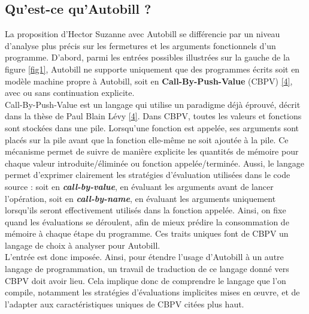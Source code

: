\documentclass[12pt]{article}
\begin{document}
\hypertarget{quest-ce-quautobill}{%
  \subsection{Qu'est-ce qu'Autobill ?}\label{quest-ce-quautobill}}

La proposition d'Hector Suzanne avec Autobill se différencie par un
niveau d'analyse plus précis sur les fermetures et les arguments
fonctionnels d'un programme. D'abord, parmi les entrées possibles
illustrées sur la gauche de la figure \ref{fig1}, Autobill ne supporte
uniquement que des programmes écrits soit en modèle machine propre à
Autobill, soit en \textbf{Call-By-Push-Value} (CBPV)
\protect\hyperlink{ref-Levy}{{[}4{]}}, avec ou sans continuation
explicite. \\ 

Call-By-Push-Value est un langage qui utilise un paradigme déjà éprouvé,
décrit dans la thèse de Paul Blain Lévy
\protect\hyperlink{ref-Levy}{{[}4{]}}. Dans CBPV, toutes les valeurs et fonctions sont stockées dans une pile. Lorsqu'une fonction est appelée, ses arguments sont placés sur la pile avant que la fonction elle-même ne soit ajoutée à la pile. Ce mécanisme permet de suivre de manière explicite les quantités de mémoire pour chaque valeur introduite/éliminée ou fonction appelée/terminée. Aussi,
le langage permet d'exprimer clairement les stratégies d'évaluation utilisées dans le code source : soit en \textbf{\textit{call-by-value}}, en évaluant les arguments avant de lancer l'opération, soit en \textbf{\textit{call-by-name}}, en évaluant les arguments uniquement lorsqu’ils seront effectivement utilisés dans la fonction appelée. Ainsi, on fixe quand les évaluations se déroulent, afin de mieux prédire la consommation de mémoire à chaque
étape du programme. Ces traits uniques font de CBPV un langage de choix à analyser pour Autobill. \\

L'entrée est donc imposée. Ainsi, pour étendre l'usage d'Autobill à un
autre langage de programmation, un travail de traduction de ce langage
donné vers CBPV doit avoir lieu. Cela implique donc de comprendre le
langage que l'on compile, notamment les stratégies d'évaluations
implicites mises en œuvre, et de l'adapter aux caractéristiques uniques
de CBPV citées plus haut. \\ 
\end{document}
